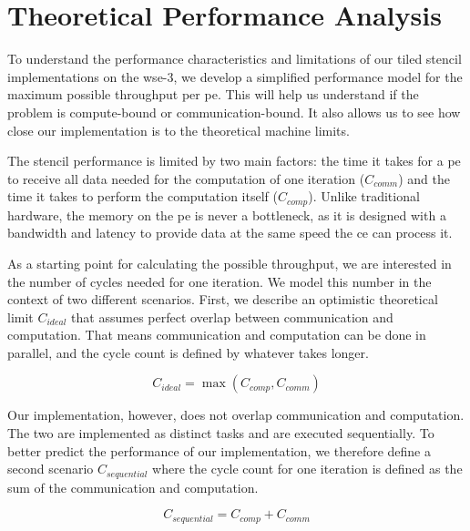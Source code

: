 \chapter{Theoretical Performance Analysis}
\label{sec:theory_performance}
To understand the performance characteristics and limitations of our tiled stencil implementations on the \ac{wse}-3, we develop a simplified performance model for the maximum possible throughput per \ac{pe}. This will help us understand if the problem is compute-bound or communication-bound. It also allows us to see how close our implementation is to the theoretical machine limits.

The stencil performance is limited by two main factors: the time it takes for a \ac{pe} to receive all data needed for the computation of one iteration ($C_{comm}$) and the time it takes to perform the computation itself ($C_{comp}$). Unlike traditional hardware, the memory on the \ac{pe} is never a bottleneck, as it is designed with a bandwidth and latency to provide data at the same speed the \ac{ce} can process it.

As a starting point for calculating the possible throughput, we are interested in the number of cycles needed for one iteration. We model this number in the context of two different scenarios. First, we describe an optimistic theoretical limit $C_{ideal}$ that assumes perfect overlap between communication and computation. That means communication and computation can be done in parallel, and the cycle count is defined by whatever takes longer.

\begin{equation}
    \label{eq:c_ideal}
    C_{ideal} = \max\left(C_{comp}, C_{comm}\right)
\end{equation}


Our implementation, however, does not overlap communication and computation. The two are implemented as distinct tasks and are executed sequentially. To better predict the performance of our implementation, we therefore define a second scenario $C_{sequential}$ where the cycle count for one iteration is defined as the sum of the communication and computation.

\begin{equation}
    \label{eq:c_sequential}
    C_{sequential} = C_{comp} + C_{comm}
\end{equation}

